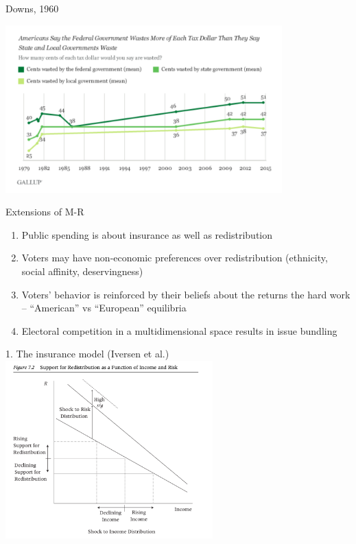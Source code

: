 \documentclass[aspectratio=169]{beamer}
\begin{document}
\begin{frame}{Downs, 1960}


\centering
\includegraphics[width=0.8\textwidth]{gallup.png}

\end{frame}
\begin{frame}{Extensions of M-R}

\begin{enumerate}

\item Public spending is about \alert{insurance} as well as redistribution
\item Voters may have \alert{non-economic preferences} over redistribution (ethnicity, social affinity, deservingness)
\item Voters' behavior is reinforced by their \alert{beliefs} about the returns the hard work -- ``American'' vs ``European'' equilibria
\item Electoral competition in a multidimensional space results in \alert{issue bundling}

\end{enumerate}

\end{frame}
\begin{frame}{1. The insurance model (Iversen et al.)}
\centering
\includegraphics[width=0.6\textwidth]{insurance.png}
\end{frame}
\end{document}
